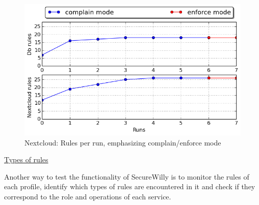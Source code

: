 \begin{figure}[h!]
  \centering
   \includegraphics[width=0.75\linewidth]{./figures/nextcloud/complain_enforce_rules.png}
   \caption{Nextcloud: Rules per run, emphasizing complain/enforce mode}
\end{figure}
\hfill\break
\underline{Types of rules}
\hfill\break

Another way to test the functionality of SecureWilly is to monitor the rules of each profile, identify which types of rules are encountered in it and check if they correspond to the role and operations of each service.

